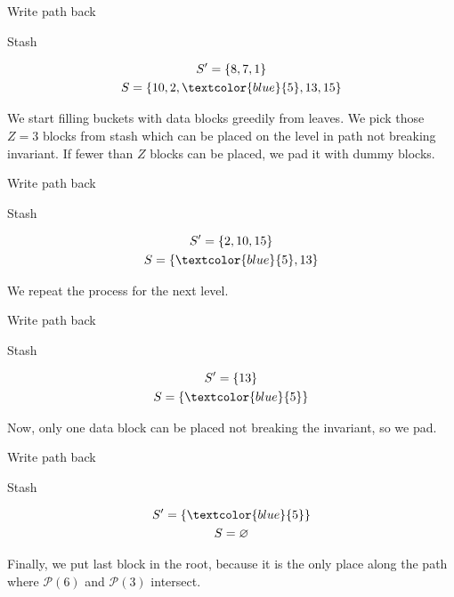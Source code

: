 	\exampleFrame%
		{Write path back}
		{
			\selectedtrue%
			\pathreadtrue%
			\nodeonenewtrue%
		}
		{}
		{
			\begin{block}{Stash}
				
				\begin{gather*}
					S^\prime = \{ 8, 7, 1 \} \\
					S = \{ 10, 2, \textcolor{blue}{5}, 13, 15 \}
				\end{gather*}
	
			\end{block}
		}
		{
			We start filling buckets with data blocks greedily from leaves.
			We pick those $Z = 3$ blocks from stash which can be placed on the level in path not breaking invariant.
			If fewer than $Z$ blocks can be placed, we pad it with dummy blocks.
		}	

	\exampleFrame%
		{Write path back}
		{
			\selectedtrue%
			\pathreadtrue%
			\nodeonenewtrue%
			\nodetwonewtrue%
		}
		{}
		{
			\begin{block}{Stash}
				
				\begin{gather*}
					S^\prime = \{ 2, 10, 15 \} \\
					S = \{ \textcolor{blue}{5}, 13 \}
				\end{gather*}
	
			\end{block}
		}
		{
			We repeat the process for the next level.
		}	

	\exampleFrame%
		{Write path back}
		{
			\selectedtrue%
			\pathreadtrue%
			\nodeonenewtrue%
			\nodetwonewtrue%
			\nodethreenewtrue%
		}
		{}
		{
			\begin{block}{Stash}
				
				\begin{gather*}
					S^\prime = \{ 13 \} \\
					S = \{ \textcolor{blue}{5} \}
				\end{gather*}
	
			\end{block}
		}
		{
			Now, only one data block can be placed not breaking the invariant, so we pad.
		}	

	\exampleFrame%
		{Write path back}
		{
			\selectedtrue%
			\pathreadtrue%
			\nodeonenewtrue%
			\nodetwonewtrue%
			\nodethreenewtrue%
			\nodefournewtrue%
		}
		{}
		{
			\begin{block}{Stash}
				
				\begin{gather*}
					S^\prime = \{ \textcolor{blue}{5} \} \\
					S = \varnothing
				\end{gather*}
	
			\end{block}
		}
		{
			Finally, we put last block in the root, because it is the only place along the path where $\mathcal{P}(6)$ and $\mathcal{P}(3)$ intersect.
		}
	
